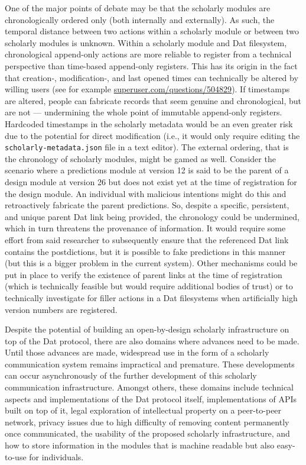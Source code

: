 \documentclass[publications,article,submit,moreauthors,pdftex,10pt,a4paper]{Definitions/mdpi}
\begin{document}
One of the major points of debate may be that the scholarly modules are
chronologically ordered only (both internally and externally). As such,
the temporal distance between two actions within a scholarly module or
between two scholarly modules is unknown. Within a scholarly module and
Dat filesystem, chronological append-only actions are more reliable to
register from a technical perspective than time-based append-only
registers. This has its origin in the fact that creation-,
modification-, and last opened times can technically be altered by
willing users (see for example
\href{https://superuser.com/questions/504829}{superuser.com/questions/504829}).
If timestamps are altered, people can fabricate records that seem
genuine and chronological, but are not --- undermining the whole point
of immutable append-only registers. Hardcoded timestamps in the
scholarly metadata would be an even greater risk due to the potential
for direct modification (i.e., it would only require editing the
\texttt{scholarly-metadata.json} file in a text editor). The external
ordering, that is the chronology of scholarly modules, might be gamed as
well. Consider the scenario where a predictions module at version 12 is
said to be the parent of a design module at version 26 but does not
exist yet at the time of registration for the design module. An
individual with malicious intentions might do this and retroactively
fabricate the parent predictions. So, despite a specific, persistent,
and unique parent Dat link being provided, the chronology could be
undermined, which in turn threatens the provenance of information. It
would require some effort from said researcher to subsequently ensure
that the referenced Dat link contains the postdictions, but it is
possible to fake predictions in this manner (but this is a bigger
problem in the current system). Other mechanisms could be put in place
to verify the existence of parent links at the time of registration
(which is technically feasible but would require additional bodies of
trust) or to technically investigate for filler actions in a Dat
filesystems when artificially high version numbers are registered.

Despite the potential of building an open-by-design scholarly
infrastructure on top of the Dat protocol, there are also domains where
advances need to be made. Until those advances are made, widespread use
in the form of a scholarly communication system remains impractical and
premature. These developments can occur asynchronously of the further
development of this scholarly communication infrastructure. Amongst
others, these domains include technical aspects and implementations of
the Dat protocol itself, implementations of APIs built on top of it,
legal exploration of intellectual property on a peer-to-peer network,
privacy issues due to high difficulty of removing content permanently
once communicated, the usability of the proposed scholarly
infrastructure, and how to store information in the modules that is
machine readable but also easy-to-use for individuals.
\end{document}
